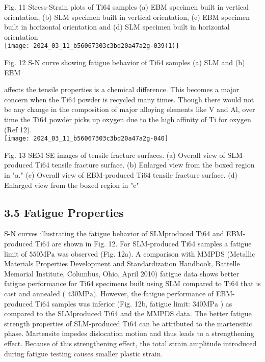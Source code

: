 \documentclass[10pt]{article}
\begin{document}
Fig. 11 Stress-Strain plots of Ti64 samples (a) EBM specimen built in vertical orientation, (b) SLM specimen built in vertical orientation, (c) EBM specimen built in horizontal orientation and (d) SLM specimen built in horizontal orientation\\
\texttt{[image: 2024\_03\_11\_b56067303c3bd20a47a2g-039(1)]}

Fig. 12 S-N curve showing fatigue behavior of Ti64 samples (a) SLM and (b) EBM

affects the tensile properties is a chemical difference. This becomes a major concern when the Ti64 powder is recycled many times. Though there would not be any change in the composition of major alloying elements like $\mathrm{V}$ and $\mathrm{Al}$, over time the Ti64 powder picks up oxygen due to the high affinity of Ti for oxygen (Ref 12).\\
\texttt{[image: 2024\_03\_11\_b56067303c3bd20a47a2g-040]}

Fig. 13 SEM-SE images of tensile fracture surfaces. (a) Overall view of SLM-produced Ti64 tensile fracture surface. (b) Enlarged view from the boxed region in "a." (c) Overall view of EBM-produced Ti64 tensile fracture surface. (d) Enlarged view from the boxed region in "c"

\subsection*{3.5 Fatigue Properties}
S-N curves illustrating the fatigue behavior of SLMproduced Ti64 and EBM-produced Ti64 are shown in Fig. 12. For SLM-produced Ti64 samples a fatigue limit of $550 \mathrm{MPa}$ was observed (Fig. 12a). A comparison with MMPDS (Metallic Materials Properties Development and Standardization Handbook, Battelle Memorial Institute, Columbus, Ohio, April 2010) fatigue data shows better fatigue performance for Ti64 specimens built using SLM compared to Ti64 that is cast and annealed ( $430 \mathrm{MPa})$. However, the fatigue performance of EBM-produced Ti64 samples was inferior (Fig. 12b, fatigue limit: $340 \mathrm{MPa}$ ) as compared to the SLMproduced Ti64 and the MMPDS data. The better fatigue strength properties of SLM-produced Ti64 can be attributed to the martensitic phase. Martensite impedes dislocation motion and thus leads to a strengthening effect. Because of this strengthening effect, the total strain amplitude introduced during fatigue testing causes smaller plastic strain.
\end{document}
